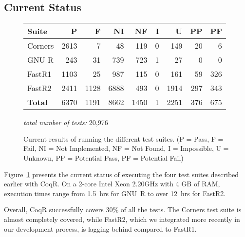\documentclass[
    sigplan,
    10pt,
    review, %
    natbib=false %
 ]{acmart}
\newcommand\eti[1]{\todo[color=blue!20,inline]{#1}}
\newcommand\CoqR{CoqR}
\begin{document}



\subsection{Current Status}
\label{sec:testing-results}



\begin{figure}[]
\centering
\begin{tabular}{|l||r|r|r|r|r|r|r|r|}
\hline
{\bf Suite}  & {\bf P} & {\bf F} & {\bf NI} & {\bf NF} & {\bf I}
& {\bf U} & {\bf PP} & {\bf PF} \\ \hline\hline
Corners     & 2613 & 7    & 48    &   119    & 0   & 149  &   20  & 6 \\ \hline
GNU R       & 243  & 31   & 739   &   723    & 1   & 27   &   0   & 0 \\ \hline
FastR1      & 1103 & 25   & 987   &    115     & 0   & 161  &   59  & 326 \\ \hline
FastR2      & 2411 & 1128 & 6888  &   493   & 0   & 1914  &   297 & 343 \\ \hline\hline
{\bf Total} & 6370 & 1191 & 8662  &   1450   &  1 & 2251  &   376 & 675 \\
\hline
\end{tabular}
{\em total number of tests:} 20,976
\caption{Current results of running the different test suites.
{\footnotesize (P = Pass, F = Fail, NI = Not Implemented, NF = Not Found, I = Impossible, \newline U = Unknown, PP = Potential Pass, PF = Potential Fail)}}
\label{fig:results}
\end{figure}


Figure~\ref{fig:results} presents the current status of executing the four test suites described earlier with \CoqR{}. On a 2-core Intel Xeon 2.20GHz with 4 GB of RAM, execution times range from 1.5~hrs for GNU~R to over 12~hrs for FastR2.

Overall, \CoqR{} successfully covers 30\% of all the tests. The Corners test suite is almost completely covered, while FastR2, which we integrated more recently in our development process, is lagging behind compared to FastR1.
\end{document}
